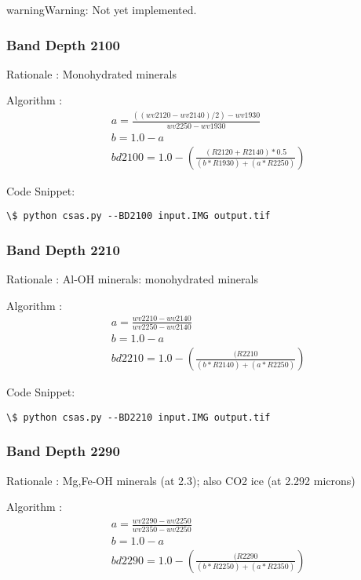 \documentclass[letterpaper,10pt,english]{sphinxmanual}
\begin{document}
\begin{notice}{warning}{Warning:}
Not yet implemented.
\end{notice}


\subsubsection{Band Depth 2100}
\label{Algorithms:band-depth-2100}
Rationale : Monohydrated minerals

Algorithm : $$\begin{aligned}
& a = \frac{((wv2120 - wv2140)/2)-wv1930}{wv2250 - wv1930} \nonumber\\
& b = 1.0 - a \nonumber\\
& bd2100 = 1.0 - (\frac{(R2120 + R2140)*0.5}{(b*R1930)+(a*R2250)})
\end{aligned}$$

Code Snippet:

\begin{Verbatim}[commandchars=\\\{\}]
\$ python csas.py --BD2100 input.IMG output.tif
\end{Verbatim}


\subsubsection{Band Depth 2210}
\label{Algorithms:band-depth-2210}
Rationale : Al-OH minerals: monohydrated minerals

Algorithm : $$\begin{aligned}
& a = \frac{wv2210 - wv2140}{wv2250 - wv2140} \nonumber\\
& b = 1.0 - a \nonumber\\
& bd2210 = 1.0 - (\frac{(R2210}{(b*R2140)+(a*R2250)})
\end{aligned}$$

Code Snippet:

\begin{Verbatim}[commandchars=\\\{\}]
\$ python csas.py --BD2210 input.IMG output.tif
\end{Verbatim}


\subsubsection{Band Depth 2290}
\label{Algorithms:band-depth-2290}
Rationale : Mg,Fe-OH minerals (at 2.3); also CO2 ice (at 2.292  microns)

Algorithm : $$\begin{aligned}
& a = \frac{wv2290 - wv2250}{wv2350 - wv2250} \nonumber\\
& b = 1.0 - a \nonumber\\
& bd2290 = 1.0 - (\frac{(R2290}{(b*R2250)+(a*R2350)})
\end{aligned}$$
\end{document}
